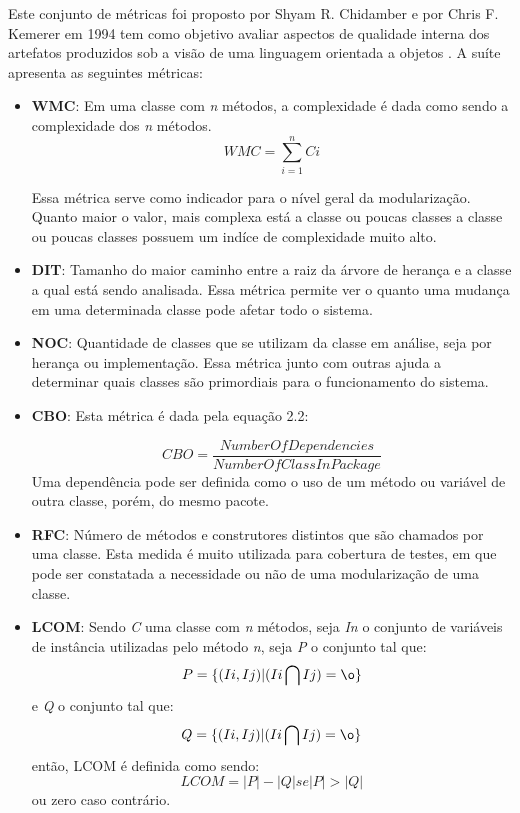 Este conjunto de métricas foi proposto por Shyam R. Chidamber e por Chris F. Kemerer em 1994 tem como objetivo avaliar aspectos de qualidade interna dos artefatos produzidos sob a visão de uma linguagem orientada a objetos \cite{chidamber}. A suíte apresenta as seguintes métricas:
\begin{itemize}

\item \textbf{WMC}: Em uma classe com \textit{n} métodos, a complexidade é dada como sendo a complexidade dos \textit{n} métodos. 
 \begin{equation}
WMC = \sum_{i=1}^{n}Ci
\end{equation}


Essa métrica serve como indicador para o nível geral da modularização. Quanto maior o valor, mais complexa está a classe ou poucas classes a classe ou poucas classes possuem um indíce de complexidade muito alto.

\item \textbf{DIT}: Tamanho do maior caminho entre a raiz da árvore de herança e a classe a qual está sendo analisada. Essa métrica permite ver o quanto uma mudança em uma determinada classe pode afetar todo o sistema.

\item \textbf{NOC}: Quantidade de classes que se utilizam da classe em análise, seja por herança ou implementação. Essa métrica junto com outras ajuda a determinar quais classes são primordiais para o funcionamento do sistema.

\item \textbf{CBO}: Esta métrica é dada pela equação 2.2: 

\begin{equation}
CBO = \frac{NumberOfDependencies}{NumberOfClassInPackage}
\end{equation}
Uma dependência pode ser definida como o uso de um método ou variável de outra classe, porém, do mesmo pacote.

\item \textbf{RFC}: Número de métodos e construtores distintos que são chamados por uma classe. Esta medida é muito utilizada para cobertura de testes, em que pode ser constatada a necessidade ou não de uma modularização de uma classe.

\item \textbf{LCOM}: Sendo \textit{C} uma classe com \textit{n} métodos, seja \textit{In} o conjunto de variáveis de instância utilizadas pelo método \textit{n}, seja \textit{P} o conjunto tal que:
\begin{equation}
P = \{(Ii,Ij)|(Ii\bigcap Ij)= \o\}
\end{equation}
e \textit{Q} o conjunto tal que:
\begin{equation}
Q = \{(Ii,Ij)|(Ii\bigcap Ij)= \o\}
\end{equation}
então, LCOM é definida como sendo:
\begin{equation}
LCOM = |P| - |Q| se |P|>|Q|
\end{equation}
ou zero caso contrário.
\end{itemize}

